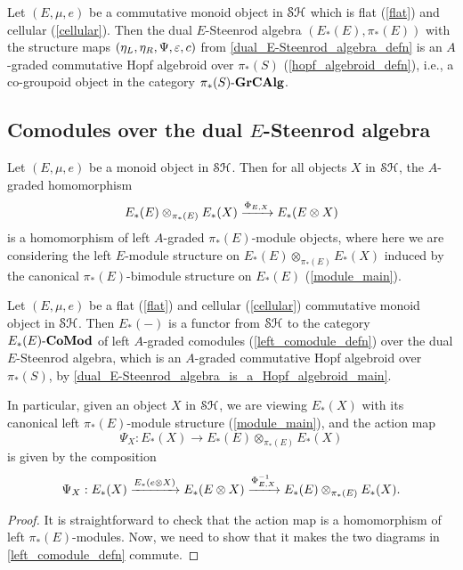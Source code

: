 \documentclass[../main.tex]{subfiles}
\begin{document}
\begin{proposition}\label{dual_E-Steenrod_algebra_is_a_Hopf_algebroid_main}
    Let $(E,\mu,e)$ be a commutative monoid object in $\mathcal{SH}$ which is flat (\autoref{flat}) and cellular (\autoref{cellular}). Then the dual $E$-Steenrod algebra $(E_*(E),\pi_*(E))$ with the structure maps $(\eta_L,\eta_R,\Psi,\varepsilon,c)$ from \autoref{dual_E-Steenrod_algebra_defn} is an $A$-graded commutative Hopf algebroid over $\pi_*(S)$ (\autoref{hopf_algebroid_defn}), i.e., a co-groupoid object in the category ${\pi_*(S)}\text-\mathbf{GrCAlg}$.
\end{proposition}

\subsection{Comodules over the dual \texorpdfstring{$E$}{E}-Steenrod algebra}

\begin{lemma}
    Let $(E,\mu,e)$ be a monoid object in $\mathcal{SH}$. Then for all objects $X$ in $\mathcal{SH}$, the $A$-graded homomorphism
    \[E_*(E)\otimes_{\pi_*(E)}E_*(X)\xrightarrow{\Phi_{E,X}}E_*(E\otimes X)\]
    is a homomorphism of left $A$-graded $\pi_*(E)$-module objects, where here we are considering the left $E$-module structure on $E_*(E)\otimes_{\pi_*(E)}E_*(X)$ induced by the canonical $\pi_*(E)$-bimodule structure on $E_*(E)$ (\autoref{module_main}).
\end{lemma}

\begin{proposition}
    Let $(E,\mu,e)$ be a flat (\autoref{flat}) and cellular (\autoref{cellular}) commutative monoid object in $\mathcal{SH}$. Then $E_*(-)$ is a functor from $\mathcal{SH}$ to the category $E_*(E)\text-\mathbf{CoMod}$ of left $A$-graded comodules (\autoref{left_comodule_defn}) over the dual $E$-Steenrod algebra, which is an $A$-graded commutative Hopf algebroid over $\pi_*(S)$, by \autoref{dual_E-Steenrod_algebra_is_a_Hopf_algebroid_main}.

    In particular, given an object $X$ in $\mathcal{SH}$, we are viewing $E_*(X)$ with its canonical left $\pi_*(E)$-module structure (\autoref{module_main}), and the action map 
    \[\Psi_X:E_*(X)\to E_*(E)\otimes_{\pi_*(E)}E_*(X)\]
    is given by the composition
    \[\Psi_X:E_*(X)\xrightarrow{E_*(e\otimes X)}E_*(E\otimes X)\xrightarrow{\Phi_{E,X}^{-1}}E_*(E)\otimes_{\pi_*(E)}E_*(X).\]
\end{proposition}
\begin{proof}
    It is straightforward to check that the action map is a homomorphism of left $\pi_*(E)$-modules. Now, we need to show that it makes the two diagrams in \autoref{left_comodule_defn} commute.
\end{proof}
\end{document}
